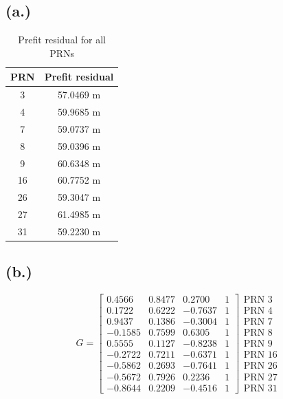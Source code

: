 \documentclass[11pt]{article}
\begin{document}
\subsection*{(a.)}
\begin{table}[h!]
    \centering
    \begin{tabular}{|c|c|}
        \hline
        \textbf{PRN} & \textbf{ Prefit residual} \\ \hline
        3  & 57.0469 m \\ \hline
        4  &   59.9685 m \\ \hline
        7  & 59.0737 m\\ \hline
        8  & 59.0396 m \\ \hline
        9  & 60.6348 m\\ \hline
        16 &   60.7752 m\\ \hline
        26 & 59.3047 m\\ \hline
        27 &61.4985 m \\ \hline
        31 & 59.2230 m\\ \hline
    \end{tabular}
    \caption{Prefit residual for all PRNs}
\end{table}




\subsection*{(b.)}
\[
G = \begin{bmatrix}
 0.4566 & 0.8477 &  0.2700 & 1 \\
 0.1722 & 0.6222 & -0.7637 & 1 \\
 0.9437 & 0.1386 & -0.3004 & 1 \\
-0.1585 & 0.7599 &  0.6305 & 1 \\
 0.5555 & 0.1127 & -0.8238 & 1 \\
-0.2722 & 0.7211 & -0.6371 & 1 \\
-0.5862 & 0.2693 & -0.7641 & 1 \\
-0.5672 & 0.7926 &  0.2236 & 1 \\
-0.8644 & 0.2209 & -0.4516 & 1
\end{bmatrix}
\begin{array}{l}
\text{PRN 3} \\ \text{PRN 4} \\ \text{PRN 7} \\ \text{PRN 8} \\ \text{PRN 9} \\ \text{PRN 16} \\ \text{PRN 26} \\ \text{PRN 27} \\ \text{PRN 31}
\end{array}
\]
\end{document}
